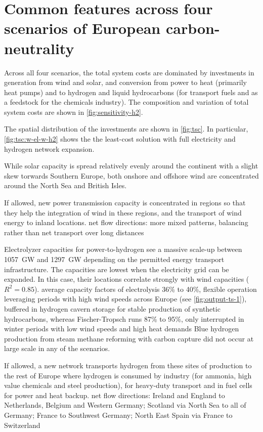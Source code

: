 \section*{Common features across four scenarios of European carbon-neutrality}
\label{sec:es}


Across all four scenarios, the total system costs are dominated by investments
in generation from wind and solar, and conversion from power to heat (primarily
heat pumps) and to hydrogen and liquid hydrocarbons (for transport fuels and as
a feedstock for the chemicals industry). The composition and variation of total
system costs are shown in \cref{fig:sensitivity-h2}.

The spatial distribution of the investments are shown in \cref{fig:tsc}. In particular, \cref{fig:tsc:w-el-w-h2} shows
the the least-cost solution with full electricity and hydrogen network expansion.


While solar capacity is spread relatively evenly around the continent with a
slight skew torwards Southern Europe, both onshore and offshore wind are
concentrated around the North Sea and British Isles.

If allowed, new power transmission capacity
is concentrated in regions so that they help the integration of wind in these
regions, and the transport of wind energy to inland locations.
net flow directions: more mixed patterns, balancing rather than net transport over long distances


Electrolyzer capacities for power-to-hydrogen see a massive scale-up between
1057~GW and 1297~GW depending on the permitted energy transport infrastructure.
The capacities are lowest when the electricity grid can be expanded.
In this case, their locations correlate strongly with wind
capacities ($R^2=0.85$).
average capacity factors of electrolysis 36\% to 40\%, flexible operation
leveraging periods with high wind speeds across Europe (see
\cref{fig:output-ts-1}), buffered in hydrogen cavern storage for stable
production of synthetic hydrocarbons, whereas Fischer-Tropsch runs 87\% to 95\%,
only interrupted in winter periods with low wind speeds and high heat demands
Blue hydrogen production from steam methane reforming with carbon capture
did not occur at large scale in any of the scenarios.

If allowed, a new network transports hydrogen from these sites of production to the rest of
Europe where hydrogen is consumed by industry (for ammonia, high value chemicals
and steel production), for heavy-duty transport and in fuel cells for power and
heat backup.
net flow directions: Ireland and England to Netherlands, Belgium and Western Germany; Scotland via North Sea to all of Germany; France to Southwest Germany; North East Spain via France to Switzerland

